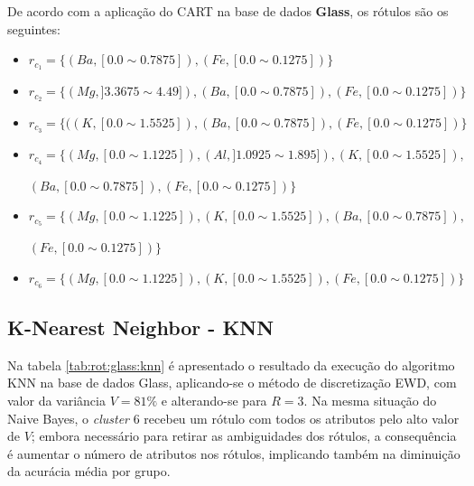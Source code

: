 De acordo com a aplicação do CART na base de dados \textbf{Glass}, os rótulos são os seguintes:
\begin{itemize}[noitemsep]
 \item ${r_{c_1}=\{ (Ba,[ 0.0 \sim 0.7875 ] ),(Fe,[ 0.0 \sim 0.1275 ] ) \} }$  
 \item ${r_{c_2}=\{ (Mg,] 3.3675 \sim  4.49 ] ),(Ba,[ 0.0 \sim 0.7875 ] ),(Fe,[ 0.0 \sim 0.1275 ] ) \} }$
 \item ${r_{c_3}=\{ ((K,[ 0.0 \sim 1.5525 ] ),(Ba,[ 0.0 \sim 0.7875 ] ),(Fe,[ 0.0 \sim 0.1275 ] )  \} }$  
 \item ${r_{c_4}=\{ (Mg,[ 0.0 \sim  1.1225 ] ),(Al,] 1.0925 \sim 1.895 ] ), (K,[ 0.0 \sim 1.5525 ] ),}$

 ${ (Ba,[ 0.0 \sim 0.7875 ] ),(Fe,[ 0.0 \sim 0.1275 ] ) \} }$
 \item ${r_{c_5}=\{ (Mg,[ 0.0 \sim  1.1225 ] ), (K,[ 0.0 \sim 1.5525 ]  ),(Ba,[ 0.0 \sim 0.7875 ] ), }$
 
 ${ (Fe,[ 0.0 \sim 0.1275 ] ) \} }$
 \item ${r_{c_6}=\{ (Mg,[ 0.0 \sim  1.1225  ] ),  (K,[ 0.0 \sim 1.5525] ),(Fe,[ 0.0 \sim 0.1275 ] ) \} }$
\end{itemize}



\subsection{K-Nearest Neighbor - KNN} \label{cap:resultados:ssec:glass:knn}



Na tabela \ref{tab:rot:glass:knn} é apresentado o resultado da execução do algoritmo KNN na base de dados Glass, aplicando-se o método de discretização EWD, com valor da variância ${V=81\%}$ e alterando-se para ${R=3}$. Na mesma situação do Naive Bayes, o \textit{cluster} 6 recebeu um rótulo com todos os atributos pelo alto valor de ${V}$; embora necessário para retirar as ambiguidades dos rótulos, a consequência é aumentar o número de atributos nos rótulos, implicando também na diminuição da acurácia média por grupo. 

